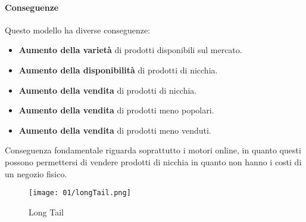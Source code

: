         \paragraph{Conseguenze} Questo modello ha diverse conseguenze:
        \begin{itemize}
            \item \textbf{Aumento della varietà} di prodotti disponibili sul mercato.
            \item \textbf{Aumento della disponibilità} di prodotti di nicchia.
            \item \textbf{Aumento della vendita} di prodotti di nicchia.
            \item \textbf{Aumento della vendita} di prodotti meno popolari.
            \item \textbf{Aumento della vendita} di prodotti meno venduti.
        \end{itemize}
        Conseguenza fondamentale riguarda soprattutto i motori online, in quanto questi possono permettersi di vendere prodotti di nicchia in quanto non hanno i costi di un negozio fisico.
        \begin{figure}[H]
            \centering
            \texttt{[image: 01/longTail.png]}
            \caption{Long Tail}
        \end{figure}
